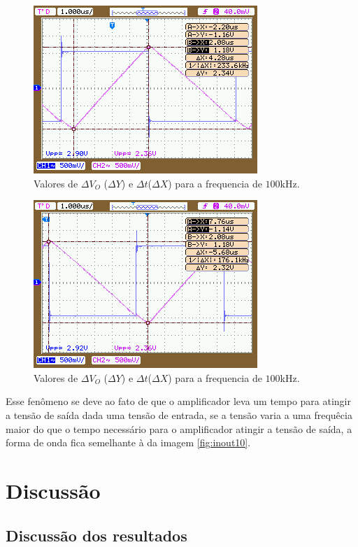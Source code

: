 \documentclass{abntex2}
\begin{document}
\begin{figure}[h]
  \centering
  \includegraphics[scale = 0.5]{NewFile11.png}
  \caption{Valores de $\Delta V_O$ ($\Delta Y$) e $\Delta t$($\Delta X$) para a frequencia de $100$kHz.}
  \label{fig:inout11}
\end{figure}

\begin{figure}[h]
  \centering
  \includegraphics[scale = 0.5]{NewFile12.png}
  \caption{Valores de $\Delta V_O$ ($\Delta Y$) e $\Delta t$($\Delta X$) para a frequencia de $100$kHz.}
  \label{fig:inout12}
\end{figure}

Esse fenômeno se deve ao fato de que o amplificador leva um tempo para atingir a tensão de saída dada uma tensão de entrada, se a tensão varia a uma frequêcia maior do que o tempo necessário para o amplificador atingir a tensão de saída, a forma de onda fica semelhante à da imagem \ref{fig:inout10}.

\chapter{Discussão}

\section{Discussão dos resultados}
\end{document}
